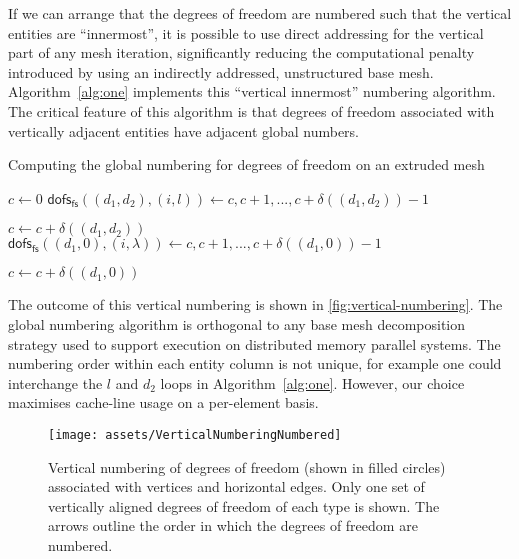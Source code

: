 \documentclass[11pt, a4paper]{scrartcl}
\begin{document}
If we can arrange that the degrees of freedom are numbered such that
the vertical entities are ``innermost'', it is possible to use direct
addressing for the vertical part of any mesh iteration, significantly
reducing the computational penalty introduced by using an indirectly
addressed, unstructured base mesh.  Algorithm~\ref{alg:one} implements
this ``vertical innermost'' numbering algorithm. The critical feature
of this algorithm is that degrees of freedom associated with
vertically adjacent entities have adjacent global numbers.
\begin{algorithm}[htbp]
\caption{Computing the global numbering for degrees of freedom on an extruded mesh}
\label{alg:one}
\begin{algorithmic}
\STATE $c \leftarrow 0$
        \STATE {}
            \STATE {}
                      \STATE {}
				\STATE $\mathsf{dofs}_{\mathsf{fs}}((d_{1}, d_{2}), (i, l)) \leftarrow c, c + 1, ..., c + \delta((d_{1}, d_{2})) - 1$

				\STATE $c \leftarrow c + \delta((d_{1}, d_{2}))$
             \ENDFOR
        \ENDFOR
        \STATE {}
	  \STATE $\mathsf{dofs}_{\mathsf{fs}}((d_{1}, 0), (i, \lambda)) \leftarrow c, c + 1, ..., c + \delta((d_{1}, 0)) - 1$

	  \STATE $c \leftarrow c + \delta((d_{1}, 0))$
\ENDFOR
\end{algorithmic}
\end{algorithm}

The outcome
of this vertical numbering is shown in
\autoref{fig:vertical-numbering}.  The global numbering algorithm is
orthogonal to any base mesh decomposition strategy used to support
execution on distributed memory parallel systems.  The numbering order
within each entity column is not unique, for example one could
interchange the $l$ and $d_2$ loops in Algorithm~\ref{alg:one}.
However, our choice maximises cache-line usage on a per-element basis.
\begin{figure}[htbp]
\centering
\texttt{[image: assets/VerticalNumberingNumbered]}
\caption{Vertical numbering of degrees of freedom (shown in filled
  circles) associated with vertices and horizontal edges. Only one set
  of vertically aligned degrees of freedom of each type is shown. The
  arrows outline the order in which the degrees of freedom are
  numbered.}
\label{fig:vertical-numbering}
\end{figure}
\end{document}
